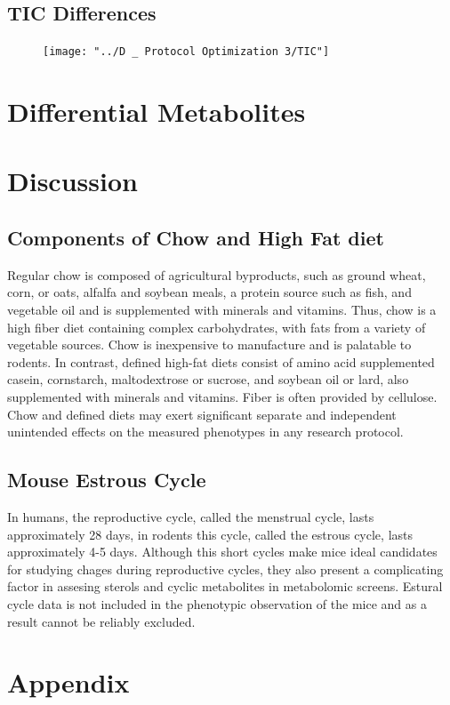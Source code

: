 \documentclass[a4paper]{article}
\begin{document}


\subsection{TIC Differences}

\begin{figure}[b]
	\centering
	\texttt{[image: "../D \_ Protocol Optimization 3/TIC"]}
	\caption[Total Ions Counts in Simiplified Extraction Protocol]{}
	\caption{}
	\label{fig:tic}
\end{figure}



\section{Differential Metabolites}





\section{Discussion}
\subsection{Components of Chow and High Fat diet}
Regular chow is composed of agricultural byproducts, such as ground wheat, corn, or oats, alfalfa and soybean meals, a protein source such as fish, and vegetable oil and is supplemented with minerals and vitamins. Thus, chow is a high fiber diet containing complex carbohydrates, with fats from a variety of vegetable sources. Chow is inexpensive to manufacture and is palatable to rodents. In contrast, defined high-fat diets consist of amino acid supplemented casein, cornstarch, maltodextrose or sucrose, and soybean oil or lard, also supplemented with minerals and vitamins. Fiber is often provided by cellulose. Chow and defined diets may exert significant separate and independent unintended effects on the measured phenotypes in any research protocol.

\subsection{Mouse Estrous Cycle}

In humans, the reproductive cycle, called the menstrual cycle, lasts approximately 28 days, in rodents this cycle, called the estrous cycle, lasts approximately 4-5 days. Although this short cycles make mice ideal candidates for studying chages during reproductive cycles, they also present a complicating factor in assesing sterols and cyclic metabolites in metabolomic screens. Estural cycle data is not included in the phenotypic observation of the mice and as a result cannot be reliably excluded.

\section{Appendix}
\end{document}
